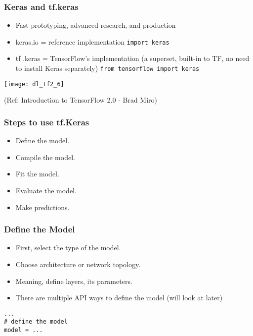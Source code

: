 \begin{frame}[fragile] \frametitle{Keras and tf.keras}

\begin{itemize}
\item  Fast prototyping, advanced research, and production
\item keras.io = reference implementation \lstinline|import keras|
\item tf .keras  = TensorFlow’s implementation (a superset, built-in to TF, no need to install Keras separately) \lstinline|from tensorflow import keras|
\end{itemize}

\begin{center}
\texttt{[image: dl\_tf2\_6]}
\end{center}

\tiny{(Ref: Introduction to TensorFlow 2.0 - Brad Miro)}
\end{frame}

\begin{frame}[fragile] \frametitle{Steps to use tf.Keras}

\begin{itemize}
\item  Define the model.
\item  Compile the model.
\item  Fit the model.
\item  Evaluate the model.
\item  Make predictions.
\end{itemize}
\end{frame}

\begin{frame}[fragile] \frametitle{Define the Model}

\begin{itemize}
\item  First, select the type of the model.
\item Choose architecture or network topology.
\item Meaning, define layers, its parameters.
\item There are multiple API ways to define the model (will look at later)
\end{itemize}

\begin{lstlisting}
...
# define the model
model = ...
\end{lstlisting}
\end{frame}

